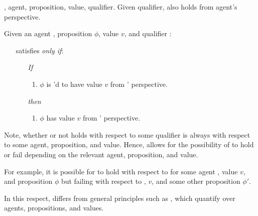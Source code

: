\begin{note}
  , agent, proposition, value, qualifier.
  Given qualifier, also holds from agent's perspective.

  \begin{absolutelynopagebreak}
    \begin{principle}[\ptivity{2}]
      \label{def:perspectivity}
      Given an agent \vAgent{}, proposition \(\phi\), value \(v\), and qualifier \ptivityQV{}:

      \begin{itemize}
      \item[]
        \ptivityQV{} satisfies \ptivity{} \emph{only if}:
      \item[]
        \begin{enumerate}[noitemsep]
        \item[\emph{If}]
          \begin{enumerate}[label=\alph*., ref=(\alph*)]
          \item
            \(\phi\) is \ptivityQV{}'d to have value \(v\) from \vAgent{}' perspective.
          \end{enumerate}
        \item[\emph{then}]
          \begin{enumerate}[label=\alph*., ref=(\alph*), resume]
          \item
            \(\phi\) has value \(v\) from \vAgent{}' perspective.
          \end{enumerate}
        \end{enumerate}
      \end{itemize}
      \vspace{-\baselineskip}
    \end{principle}
  \end{absolutelynopagebreak}

  Note, whether or not \ptivity{} holds with respect to some qualifier \ptivityQV{} is always with respect to some agent, proposition, and value.
  Hence, \ptivity{} allows for the possibility of \ptivity{} to hold or fail depending on the relevant agent, proposition, and value.

  For example, it is possible for \ptivity{} to hold with respect to \ptivityQV{} for some agent \vAgent{}, value \(v\), and proposition \(\phi\) but failing with respect to \vAgent{}, \(v\), and some other proposition \(\phi'\).

  In this respect, \ptivity{} differs from general principles such as \factivity{}, which quantify over agents, propositions, and values.


\end{note}
